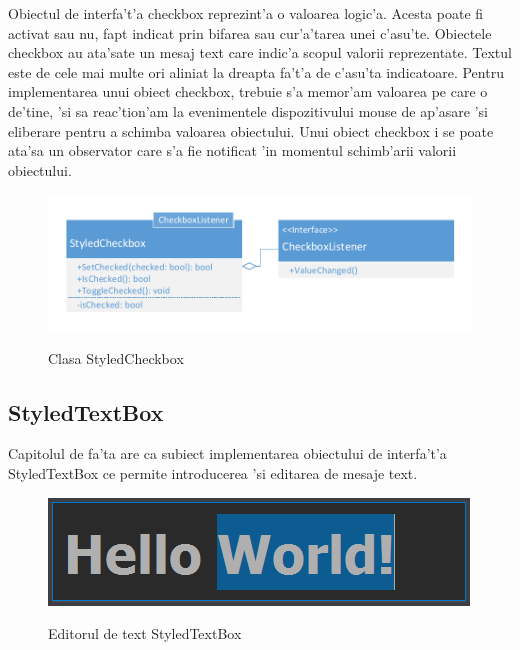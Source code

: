 Obiectul de interfa't'a checkbox reprezint'a o valoarea logic'a. Acesta poate fi activat sau nu, fapt indicat prin bifarea sau cur'a'tarea unei c'asu'te. Obiectele checkbox au ata'sate un mesaj text care indic'a scopul valorii reprezentate. Textul este de cele mai multe ori aliniat la dreapta fa't'a de c'asu'ta indicatoare. Pentru implementarea unui obiect checkbox, trebuie s'a memor'am valoarea pe care o de'tine, 'si sa reac'tion'am la evenimentele dispozitivului mouse de ap'asare 'si eliberare pentru a schimba valoarea obiectului. Unui obiect checkbox i se poate ata'sa un observator care s'a fie notificat 'in momentul schimb'arii valorii obiectului.

\begin{center}
\begin{figure}[h]
    \centering
    \includegraphics{img/uml_class_checkbox.pdf}
    \label{fig0510}
    \caption{Clasa StyledCheckbox}
\end{figure}
\end{center}


\subsection{StyledTextBox}

Capitolul de fa'ta are ca subiect implementarea obiectului de interfa't'a StyledTextBox ce permite introducerea 'si editarea de mesaje text. 

\begin{center}
\begin{figure}[h]
    \centering
    \includegraphics{img/ch5_styledtextbox.png}
    \label{fig:fig_5_1}
    \caption{Editorul de text StyledTextBox}
\end{figure}
\end{center}

